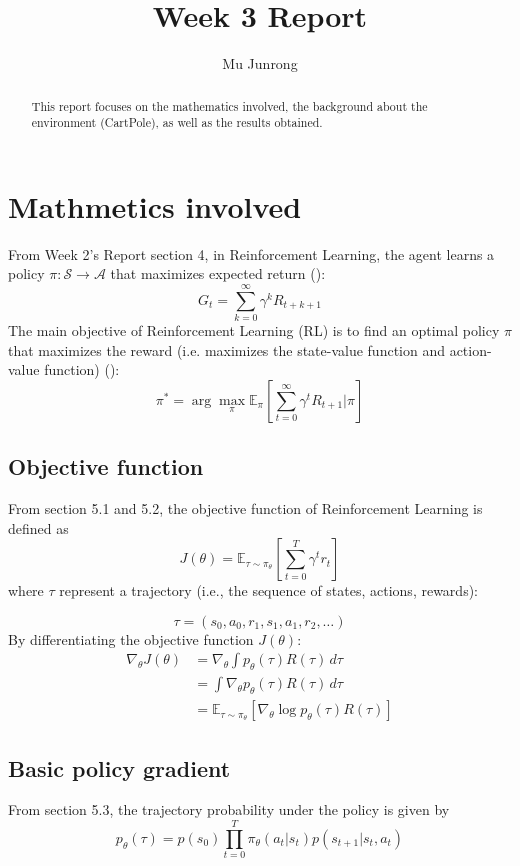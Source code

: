 \documentclass{article} %
\title{Week 3 Report}
\author{Mu Junrong}
\begin{document}
\ifcolmsubmission
\linenumbers
\fi

\maketitle

\begin{abstract}
This report focuses on the mathematics involved, 
the background about the environment (CartPole), as well as the results obtained.
\end{abstract}

\section{Mathmetics involved}
From Week 2's Report section 4, in Reinforcement Learning, the agent learns a policy \(\pi : \mathcal{S} \to \mathcal{A}\) 
that maximizes expected return (\cite{sutton2018reinforcement}):
\[G_t = \sum_{k=0}^\infty \gamma^k R_{t+k+1}\]
The main objective of Reinforcement Learning (RL) is to find an optimal policy $\pi$ that maximizes the reward (i.e. maximizes the state-value function and action-value function) (\cite{sutton1999policy}):
\[
\pi^{*} = \arg \max_{\pi} \mathbb{E}_{\pi} \left[ \sum_{t=0}^{\infty} \gamma^t R_{t+1} | \pi \right]
\]

\subsection{Objective function}
From section 5.1 and 5.2, the objective function of Reinforcement Learning is defined as
\[
J(\theta) = \mathbb{E}_{\tau \sim \pi_{\theta}} \left[ \sum_{t=0}^{T} \gamma^{t} r_{t} \right]
\]
where \(\tau\) represent a trajectory (i.e., the sequence of states, actions, rewards):

\[
\tau = (s_0, a_0, r_1, s_1, a_1, r_2, \ldots)
\]
By differentiating the objective function \(J(\theta)\):
\begin{align*}
\nabla_\theta J(\theta) &= \nabla_\theta \int p_\theta(\tau) R(\tau) \,d\tau \\
&= \int \nabla_\theta p_\theta(\tau) R(\tau) \,d\tau \\
&= \mathbb{E}_{\tau \sim \pi_\theta} \left[ \nabla_\theta \log p_\theta(\tau) R(\tau) \right]
\end{align*}

\subsection{Basic policy gradient}
From section 5.3, the trajectory probability under the policy is given by
\[p_\theta(\tau) = p(s_0) \prod_{t=0}^{T} \pi_\theta(a_t|s_t) p(s_{t+1}|s_t, a_t)\]
\end{document}
